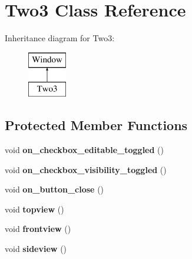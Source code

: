 \hypertarget{class_two3}{}\section{Two3 Class Reference}
\label{class_two3}
Inheritance diagram for Two3\+:\begin{figure}[H]
\begin{center}
\leavevmode
\includegraphics[height=2.000000cm]{class_two3}
\end{center}
\end{figure}
\subsection*{Protected Member Functions}
\begin{DoxyCompactItemize}
\item 
\mbox{\label{class_two3_ab375e8888ef602a5f99df24c6795858c}} 
void {\bfseries on\+\_\+checkbox\+\_\+editable\+\_\+toggled} ()
\item 
\mbox{\label{class_two3_a2552f1956475c6e7534d90abddb08593}} 
void {\bfseries on\+\_\+checkbox\+\_\+visibility\+\_\+toggled} ()
\item 
\mbox{\label{class_two3_a61eecd5981740cc224f6b0d26647eaf0}} 
void {\bfseries on\+\_\+button\+\_\+close} ()
\item 
\mbox{\label{class_two3_adb5d5554ce8ff4d41da0b53239e5cce3}} 
void {\bfseries topview} ()
\item 
\mbox{\label{class_two3_a6599c6567169b47d275b5ee4835b3b00}} 
void {\bfseries frontview} ()
\item 
\mbox{\label{class_two3_ae834b892a5ad297ab46862026392e919}} 
void {\bfseries sideview} ()
\end{DoxyCompactItemize}
